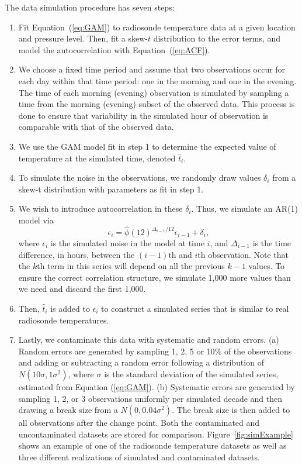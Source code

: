 \documentclass[12pt]{article}
\begin{document}
\begin{doublespacing}
The data simulation procedure has seven steps:
\begin{enumerate}
	\item Fit Equation~(\ref{eq:GAM}) to radiosonde temperature data at a given location and pressure level.  Then, fit a skew-$t$ distribution to the error terms, and model the autocorrelation with Equation~(\ref{eq:ACF}).
	\item We choose a fixed time period and assume that two observations occur for each day within that time period: one in the morning and one in the evening.  The time of each morning (evening) observation is simulated by sampling a time from the morning (evening) subset of the observed data.  This process is done to ensure that variability in the simulated hour of observation is comparable with that of the observed data.
	\item We use the GAM model fit in step 1 to determine the expected value of temperature at the simulated time, denoted $\hat t_i$.
	\item To simulate the noise in the observations, we randomly draw values $\delta_i$ from a skew-t distribution with parameters as fit in step 1.
	\item We wish to introduce autocorrelation in these $\delta_i$.  Thus, we simulate an AR(1) model via
	\begin{equation*}
	\epsilon_i = \widehat{\phi}(12)^{\Delta_{i-1}/12} \epsilon_{i-1} + \delta_i,
	\end{equation*}
	where $\epsilon_i$ is the simulated noise in the model at time $i$, and $\Delta_{i-1}$ is the time difference, in hours, between the $(i-1)$th and $i$th observation.  Note that the $k$th term in this series will depend on all the previous $k-1$ values.  To ensure the correct correlation structure, we simulate 1,000 more values than we need and discard the first 1,000.
	\item Then, $\hat{t}_i$ is added to $\epsilon_i$ to construct a simulated series that is similar to real radiosonde temperatures.
	
	\item Lastly, we contaminate this data with systematic and random errors.  (a) Random errors are generated by sampling 1, 2, 5 or 10\% of the observations and adding or subtracting a random error following a distribution of $N(10\sigma,1\sigma^2)$, where $\sigma$ is the standard deviation of the simulated series, estimated from Equation (\ref{eq:GAM}).  (b) Systematic errors are generated by sampling 1, 2, or 3 observations uniformly per simulated decade and then drawing a break size from a $N(0,0.04 \sigma^2)$.  The break size is then added to all observations after the change point.  Both the contaminated and uncontaminated datasets are stored for comparison.  Figure~\ref{fig:simExample} shows an example of one of the radiosonde temperature datasets as well as three different realizations of simulated and contaminated datasets.
\end{enumerate}


\end{doublespacing}
\end{document}
